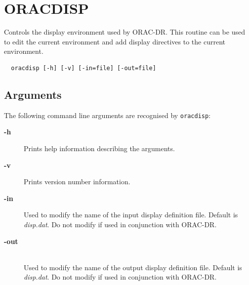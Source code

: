 \documentclass[twoside,11pt]{article}
\newcommand{\underscore}{\leavevmode\kern.04em\vbox{\hrule width 0.4em height 0.3pt}}
\newcommand{\xlabel}[1]{}
\renewcommand{\_}{\texttt{\symbol{95}}}
\begin{document}

\section{ORACDISP\xlabel{oracdisp}}%


Controls the display environment used by ORAC-DR. This routine
can be used to edit the current environment and add display directives
to the current environment.

\begin{verbatim}
  oracdisp [-h] [-v] [-in=file] [-out=file]
\end{verbatim}


\subsection*{Arguments}%

The following command line arguments are recognised by {\tt oracdisp}:

\begin{description}

\item[{\bf -h}]%
%

Prints help information describing the arguments.

\item[{\bf -v}]%
%

Prints version number information.

\item[{\bf -in}]%
%

Used to modify the name of the input display definition file.
Default is {\em disp.dat\/}. Do not modify if used in conjunction with
ORAC-DR.

\item[{\bf -out}]%
%
\hfil\\
Used to modify the name of the output display definition file.
Default is {\em disp.dat\/}. Do not modify if used in conjunction with
ORAC-DR.

\end{description}
\end{document}
